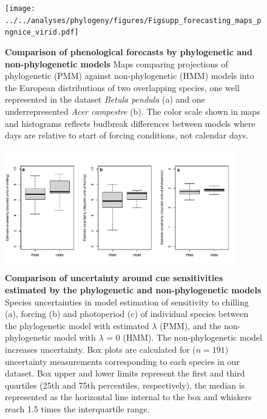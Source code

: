 \documentclass{article}
\begin{document}
\clearpage


\begin{figure}
\centering
\noindent \texttt{[image: ../../analyses/phylogeny/figures/Figsupp\_forecasting\_maps\_pngnice\_virid.pdf]}
  \caption{\textbf{Comparison of phenological forecasts by phylogenetic and non-phylogenetic models} Maps comparing projections of phylogenetic (PMM) against non-phylogenetic (HMM) models into the European distributions of two overlapping species, one well represented in the dataset \emph{Betula pendula} (a) and one underrepresented \emph{Acer campestre} (b). The color scale shown in maps and histograms reflects budbreak differences between models where days are relative to start of forcing conditions, not calendar days.}
  \label{fig:pmmvshmm}
\end{figure}
\clearpage


\begin{figure}
  \centering
\noindent \includegraphics[width=0.9\textwidth]{../../analyses/phylogeny/figures/FigSXX_cue_uncert_lambest0.pdf}
  \caption{\textbf{Comparison of uncertainty around cue sensitivities estimated by the phylogenetic and non-phylogenetic models} Species uncertainties in model estimation of sensitivity to chilling (a), forcing (b) and photoperiod (c) of individual species between the phylogenetic model with estimated $\lambda$ (PMM), and the non-phylogenetic model with $\lambda$ = 0 (HMM). The non-phylogenetic model increases uncertainty. Box plots are calculated for ($n = 191$) uncertainty measurements corresponding to each species in our dataset. Box upper and lower limits represent the first and third quartiles (25th and 75th percentiles, respectively), the median is represented as the horizontal line internal to the box and whiskers reach 1.5 times the interquartile range.}
  \label{fig:suppuncertainties}
\end{figure}
\clearpage
\end{document}
